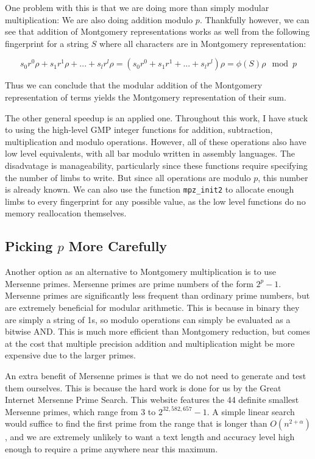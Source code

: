 \documentclass[ %
                    author={Dominic Joseph Moylett},
                    degree={MEng},
                     title={Dictionary Matching with Fingerprints},
                  subtitle={An Empirical Analysis},
                      type={research},
                      year={2015} ]{dissertation}
\begin{document}
One problem with this is that we are doing more than simply modular multiplication: We are also doing addition modulo $p$. Thankfully however, we can see that addition of Montgomery representations works as well from the following fingerprint for a string $S$ where all characters are in Montgomery representation:

$$s_0r^0\rho + s_1r^1\rho + ... + s_lr^l\rho = (s_0r^0 + s_1r^1 + ... + s_lr^l)\rho = \phi(S)\rho \mod p$$

Thus we can conclude that the modular addition of the Montgomery representation of terms yields the Montgomery representation of their sum.

The other general speedup is an applied one. Throughout this work, I have stuck to using the high-level GMP integer functions for addition, subtraction, multiplication and modulo operations. However, all of these operations also have low level equivalents, with all bar modulo written in assembly languages. The disadvatage is manageability, particularly since these functions require specifying the number of limbs to write. But since all operations are modulo $p$, this number is already known. We can also use the function \texttt{mpz\_init2} to allocate enough limbs to every fingerprint for any possible value, as the low level functions do no memory reallocation themselves.

\subsection{Picking $p$ More Carefully}
\label{ssec:pick-p}

Another option as an alternative to Montgomery multiplication is to use Mersenne primes. Mersenne primes are prime numbers of the form $2^p - 1$. Mersenne primes are significantly less frequent than ordinary prime numbers, but are extremely beneficial for modular arithmetic. This is because in binary they are simply a string of 1s, so modulo operations can simply be evaluated as a bitwise AND. This is much more efficient than Montgomery reduction, but comes at the cost that multiple precision addition and multiplication might be more expensive due to the larger primes.

An extra benefit of Mersenne primes is that we do not need to generate and test them ourselves. This is because the hard work is done for us by the Great Internet Mersenne Prime Search\cite{website:gimps-known}. This website features the 44 definite smallest Mersenne primes, which range from 3 to $2^{32,582,657}-1$. A simple linear search would suffice to find the first prime from the range that is longer than $O(n^{2 + \alpha})$, and we are extremely unlikely to want a text length and accuracy level high enough to require a prime anywhere near this maximum.
\end{document}

